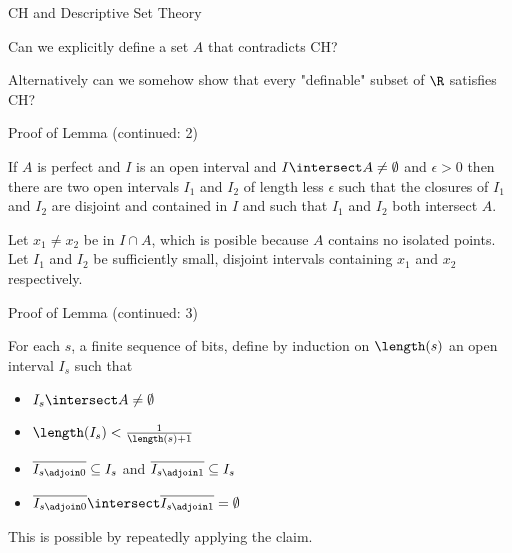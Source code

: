\begin{frame}{CH and Descriptive Set Theory}

\begin{question}
Can we explicitly define a set $A$ that contradicts CH?
\end{question}

\begin{question}
Alternatively can we somehow show that every "definable" subset of
$\R$ satisfies CH?
\end{question}

\end{frame}

\begin{frame}{Proof of Lemma (continued: 2)}

\begin{claim}
If $A$ is perfect and $I$ is an open interval and $I \intersect A \neq
\emptyset$ and $\epsilon > 0$ then there are two open intervals $I_1$ and
$I_2$ of length less $\epsilon$ such that the closures of $I_1$ and
$I_2$ are disjoint and contained in $I$ and such that $I_1$ and $I_2$
both intersect $A$.
\end{claim}

\begin{subproof}
Let $x_1 \neq x_2$ be in $I \cap A$, which is posible because $A$
contains no isolated points. Let $I_1$ and $I_2$ be sufficiently small,
disjoint intervals containing $x_1$ and $x_2$ respectively.
\end{subproof}

\end{frame}

\begin{frame}{Proof of Lemma (continued: 3)}

For each $s$, a finite sequence of bits, define by induction on $\length(s)$
an open interval $I_s$ such that

\pause

\begin{itemize}
  \item  $I_s \intersect A \neq \emptyset$

  \item   $\length(I_s) < \frac{1}{\length(s) + 1}$

  \item  $\overline{I_{s \adjoin 0}} \subseteq I_s$ and $\overline{I_{s \adjoin 1}} \subseteq I_s$

  \item  $\overline{I_{s \adjoin 0}} \intersect \overline{I_{s \adjoin 1}} = \emptyset$

\end{itemize}

\pause

This is possible by repeatedly applying the claim.

\end{frame}

